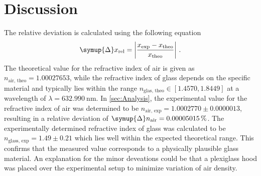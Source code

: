 \section{Discussion}
\label{sec:Discussion}
The relative deviation is calculated using the following equation
\begin{equation*}
    \symup{\Delta} x_{\text{rel}} = \left| \frac{x_{\text{exp}} - x_{{\text{theo}}}}{x_{{\text{theo}}}}\right|\,.
\end{equation*}
The theoretical value for the refractive index of air is given as $n_{\text{air, theo}}=1.00027653$, while the refractive index of 
glass depends on the specific material and typically lies within the range $n_{\text{glas, theo}}\in [1.4570, 1.8449]$ at a 
wavelength of $\lambda = \SI{632.990}{\nano\meter}$. 
In \autoref{sec:Analysis}, the experimental value for the refractive index of air was determined to be 
$n_{\text{air, exp}} = 1.0002770\pm0.0000013$, resulting in a relative deviation of $\symup{\Delta}n_{\text{air}} = 0.00005015\,\%$. 
The experimentally determined refractive index of glass was calculated to be $n_{\text{glass, exp}} = 1.49\pm0.21$ which lies 
well within the expected theoretical range. 
This confirms that the measured value corresponds to a physically plausible glass material.
An explanation for the minor deveations could be that a plexiglass hood was placed over the experimental setup to minimize 
variation of air density.